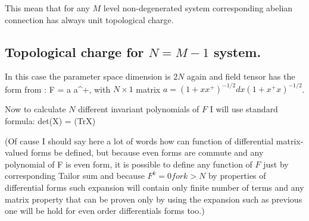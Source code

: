 This mean that for any $M$ level non-degenerated system corresponding 
abelian connection has always unit topological charge.

 
 
\subsection{Topological charge for $N=M-1$ system.}

In this case the parameter space dimension is $2N$ again and 
field tensor has the form from :
\be
F = a \wedge a^+,
\ee
with $N\times 1$ matrix $a = (1 + xx^+)^{-1/2} dx (1 + x^+x)^{-1/2}$.

Now to calculate $N$ different invariant polynomials of $F$
I will use standard formula:
\be
det(X) = \exp (Tr\log X)
\ee   

(Of cause I should say here a lot of words how can function of differential
matrix-valued forms be defined, but because even forms are commute
and any polynomial of F is even form, it is possible to define
any function of $F$ just by corresponding Tailor sum and because 
$F^k = 0 for k > N$ by properties of differential forms such expansion
will contain only finite number of terms and any matrix property that 
can be proven only by using the expansion such as previous one will
be hold for even order differentials forms too.) 

